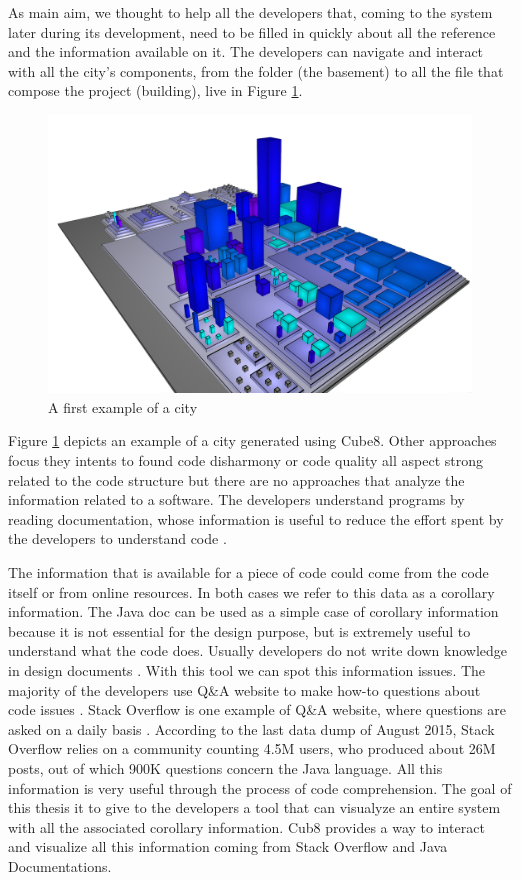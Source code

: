 \documentclass[]{usiinfbachelorproject}
\begin{document}
As main aim, we thought to help all the developers that, coming to the system later during its development, need to be filled in quickly about all the reference and the information available on it.
The developers can navigate and interact with all the city's components, from the folder (the basement) to all the file that compose the project (building), live in Figure \ref{fig:myO}. 


\begin{figure}[h]
	\centering
	\includegraphics[width=.95\textwidth]{images/city1}
	\caption{A first example of a city\label {fig:myO}}
\end{figure}


Figure \ref{fig:myO} depicts an example of a city generated using Cube8.
Other approaches focus they intents to found code disharmony \cite{programComp} or code quality \cite{VVV} all aspect strong related to the code structure but there are no approaches that analyze the information related to a software. The developers understand programs by reading documentation, whose information is useful to reduce the effort spent by the developers to understand code \cite{Corbi}.

The information that is available for a piece of code could come from the code itself or from online resources. In both cases we refer to this data as a corollary information.
The Java doc can be used as a simple case of corollary information because it is not essential for the design purpose, but is extremely useful to understand what the code does. Usually developers do not write down knowledge in design documents \cite{LaToza}. With this tool we can spot this information issues.
The majority of the developers use Q\&A website to make  how-to questions about code issues \cite{Treude}. Stack Overflow is one example of Q\&A website, where questions are asked on a daily basis \cite{QEA}. According to the last data dump of August 2015, Stack Overflow relies on a community counting 4.5M users, who produced about 26M posts, out of which 900K questions concern the Java language. All this information is very useful through the process of code comprehension.
The goal of this thesis it to give to the developers a tool that can visualyze an entire system with all the associated corollary information. Cub8 provides a way to interact and visualize all this information coming from Stack Overflow and Java Documentations.
\end{document}
